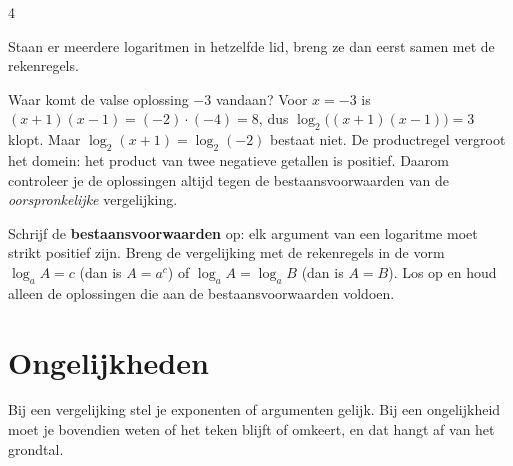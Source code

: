 \begin{alleenvoor}{4}
\begin{oefeningen}

\end{oefeningen}

Staan er meerdere logaritmen in hetzelfde lid, breng ze dan eerst samen met de rekenregels.


Waar komt de valse oplossing $-3$ vandaan? Voor $x = -3$ is $(x + 1)(x - 1) = (-2) \cdot (-4) = 8$, dus $\log_2\bigl((x + 1)(x - 1)\bigr) = 3$ klopt. Maar $\log_2(x + 1) = \log_2(-2)$ bestaat niet. De productregel vergroot het domein: het product van twee negatieve getallen is positief. Daarom controleer je de oplossingen altijd tegen de bestaansvoorwaarden van de \textit{oorspronkelijke} vergelijking.

\begin{werkwijze}
Schrijf de \textbf{bestaansvoorwaarden} op: elk argument van een logaritme moet strikt positief zijn. Breng de vergelijking met de rekenregels in de vorm $\log_a A = c$ (dan is $A = a^c$) of $\log_a A = \log_a B$ (dan is $A = B$). Los op en houd alleen de oplossingen die aan de bestaansvoorwaarden voldoen.
\end{werkwijze}

\begin{oefeningen}
\end{oefeningen}

\section{Ongelijkheden}

Bij een vergelijking stel je exponenten of argumenten gelijk. Bij een ongelijkheid moet je bovendien weten of het teken blijft of omkeert, en dat hangt af van het grondtal.


\end{alleenvoor}
